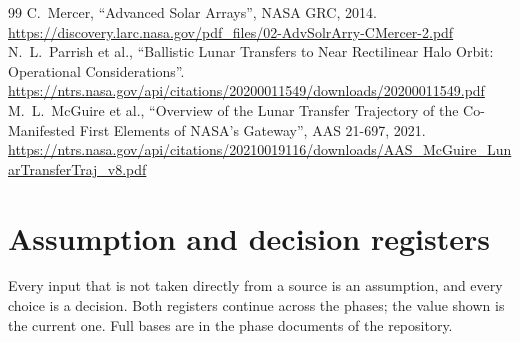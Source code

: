 \documentclass[11pt,a4paper]{article}
\begin{document}
\begin{thebibliography}{99}
 C.~Mercer, ``Advanced Solar Arrays'', NASA GRC, 2014. \url{https://discovery.larc.nasa.gov/pdf_files/02-AdvSolrArry-CMercer-2.pdf}
 N.~L.~Parrish et al., ``Ballistic Lunar Transfers to Near Rectilinear Halo Orbit: Operational Considerations''. \url{https://ntrs.nasa.gov/api/citations/20200011549/downloads/20200011549.pdf}
 M.~L.~McGuire et al., ``Overview of the Lunar Transfer Trajectory of the Co-Manifested First Elements of NASA's Gateway'', AAS 21-697, 2021. \url{https://ntrs.nasa.gov/api/citations/20210019116/downloads/AAS_McGuire_LunarTransferTraj_v8.pdf}
\end{thebibliography}

\appendix
\newpage
\section{Assumption and decision registers}\label{app:registers}

Every input that is not taken directly from a source is an assumption, and every choice is a decision. Both registers continue across the phases; the value shown is the current one. Full bases are in the phase documents of the repository.
\end{document}
